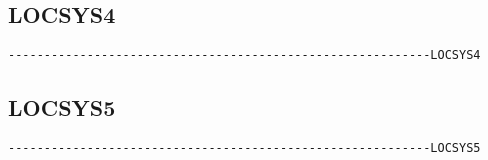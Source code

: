 

\subsection{LOCSYS4}
\begin{verbatim}
-----------------------------------------------------------LOCSYS4
\end{verbatim}




\subsection{LOCSYS5}
\begin{verbatim}
-----------------------------------------------------------LOCSYS5
\end{verbatim}


